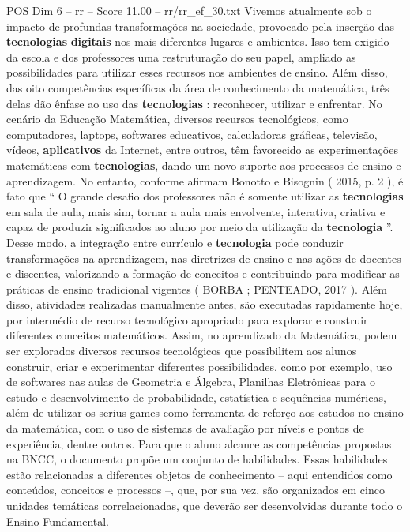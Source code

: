 \begin{textsample}{POS Dim 6 – rr – Score 11.00 – rr/rr\_ef\_30.txt}
Vivemos atualmente sob o impacto de profundas transformações na sociedade, provocado pela inserção das \textbf{tecnologias} \textbf{digitais} nos mais diferentes lugares e ambientes.
Isso tem exigido da escola e dos professores uma restruturação do seu papel, ampliado as possibilidades para utilizar esses recursos nos ambientes de ensino.
Além disso, das oito competências específicas da área de conhecimento da matemática, três delas dão ênfase ao uso das \textbf{tecnologias} : reconhecer, utilizar e enfrentar.
No cenário da Educação Matemática, diversos recursos tecnológicos, como computadores, laptops, softwares educativos, calculadoras gráficas, televisão, vídeos, \textbf{aplicativos} da Internet, entre outros, têm favorecido as experimentações matemáticas com \textbf{tecnologias}, dando um novo suporte aos processos de ensino e aprendizagem.
No entanto, conforme afirmam Bonotto e Bisognin ( 2015, p. 2 ), é fato que “ O grande desafio dos professores não é somente utilizar as \textbf{tecnologias} em sala de aula, mais sim, tornar a aula mais envolvente, interativa, criativa e capaz de produzir significados ao aluno por meio da utilização da \textbf{tecnologia} ”.
Desse modo, a integração entre currículo e \textbf{tecnologia} pode conduzir transformações na aprendizagem, nas diretrizes de ensino e nas ações de docentes e discentes, valorizando a formação de conceitos e contribuindo para modificar as práticas de ensino tradicional vigentes ( BORBA ; PENTEADO, 2017 ).
Além disso, atividades realizadas manualmente antes, são executadas rapidamente hoje, por intermédio de recurso tecnológico apropriado para explorar e construir diferentes conceitos matemáticos.
Assim, no aprendizado da Matemática, podem ser explorados diversos recursos tecnológicos que possibilitem aos alunos construir, criar e experimentar diferentes possibilidades, como por exemplo, uso de softwares nas aulas de Geometria e Álgebra, Planilhas Eletrônicas para o estudo e desenvolvimento de probabilidade, estatística e sequências numéricas, além de utilizar os serius games como ferramenta de reforço aos estudos no ensino da matemática, com o uso de sistemas de avaliação por níveis e pontos de experiência, dentre outros.
Para que o aluno alcance as competências propostas na BNCC, o documento propõe um conjunto de habilidades.
Essas habilidades estão relacionadas a diferentes objetos de conhecimento – aqui entendidos como conteúdos, conceitos e processos –, que, por sua vez, são organizados em cinco unidades temáticas correlacionadas, que deverão ser desenvolvidas durante todo o Ensino Fundamental.

\end{textsample}
